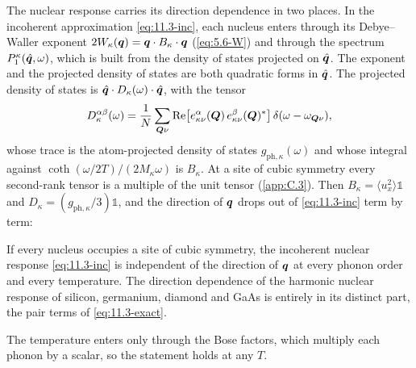 The nuclear response carries its direction dependence in two places. In the incoherent approximation \cref{eq:11.3-inc}, each nucleus enters through its Debye--Waller exponent $2W_\kappa(\bm{q}) = \bm{q}\cdot B_\kappa\cdot\bm{q}$ (\cref{eq:5.6-W}) and through the spectrum $P^\kappa_1(\hat{\bm{q}},\omega)$, which is built from the density of states projected on $\hat{\bm{q}}$. The exponent and the projected density of states are both quadratic forms in $\hat{\bm{q}}$. The projected density of states is $\hat{\bm{q}}\cdot D_\kappa(\omega)\cdot\hat{\bm{q}}$, with the tensor
\begin{equation*}
  D^{\alpha\beta}_\kappa(\omega) = \frac1N\sum_{\bm{Q}\nu}\operatorname{Re}\bigl[e^\alpha_{\kappa\nu}(\bm{Q})\,e^{\beta}_{\kappa\nu}(\bm{Q})^*\bigr]\,\delta(\omega - \omega_{\bm{Q}\nu}) ,
\end{equation*}
whose trace is the atom-projected density of states $g_{\mathrm{ph},\kappa}(\omega)$ and whose integral against $\coth(\omega/2T)/(2M_\kappa\omega)$ is $B_\kappa$. At a site of cubic symmetry every second-rank tensor is a multiple of the unit tensor (\cref{app:C.3}). Then $B_\kappa = \langle u_x^2\rangle\mathbb{1}$ and $D_\kappa = (g_{\mathrm{ph},\kappa}/3)\mathbb{1}$, and the direction of $\bm{q}$ drops out of \cref{eq:11.3-inc} term by term:
\begin{keyresult}
If every nucleus occupies a site of cubic symmetry, the incoherent nuclear response \cref{eq:11.3-inc} is independent of the direction of $\bm{q}$ at every phonon order and every temperature. The direction dependence of the harmonic nuclear response of silicon, germanium, diamond and GaAs is entirely in its distinct part, the pair terms of \cref{eq:11.3-exact}.
\end{keyresult}
\noindent The temperature enters only through the Bose factors, which multiply each phonon by a scalar, so the statement holds at any $T$.


